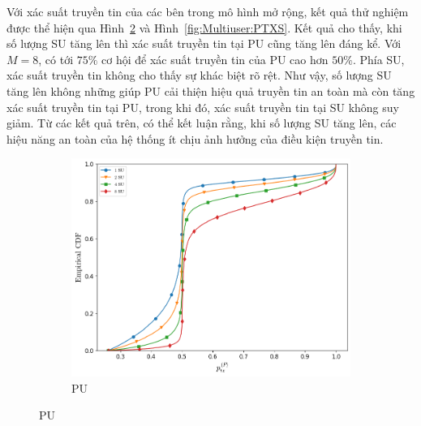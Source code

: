 \documentclass[../main.tex]{subfiles}
\begin{document}
Với xác suất truyền tin của các bên trong mô hình mở rộng, kết quả thử nghiệm được thể hiện qua Hình~\ref{fig:Multiuser:PTXP} và Hình~\ref{fig:Multiuser:PTXS}. Kết quả cho thấy, khi số lượng SU tăng lên thì xác suất truyền tin tại PU cũng tăng lên đáng kể. Với $M=8$, có tới $75\%$ cơ hội để xác suất truyền tin của PU cao hơn $50\%$. Phía SU, xác suất truyền tin không cho thấy sự khác biệt rõ rệt. Như vậy, số lượng SU tăng lên không những giúp PU cải thiện hiệu quả truyền tin an toàn mà còn tăng xác suất truyền tin tại PU, trong khi đó, xác suất truyền tin tại SU không suy giảm. Từ các kết quả trên, có thể kết luận rằng, khi số lượng SU tăng lên, các hiệu năng an toàn của hệ thống ít chịu ảnh hưởng của điều kiện truyền tin.

\begin{figure}
\centering
\captionsetup{justification=centering}

\begin{subfigure}{.8\textwidth}
\centering
\captionsetup{justification=centering}
\includegraphics[width=1\linewidth]{Figures/multisus-ptxp.png}
\caption{PU}
\label{fig:Multiuser:PTXP}
\end{subfigure}


\end{figure}
\end{document}
